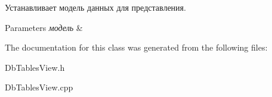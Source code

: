 Устанавливает модель данных для представления. 


\begin{DoxyParams}{Parameters}
{\em модель} & \\
\hline
\end{DoxyParams}


The documentation for this class was generated from the following files\+:\begin{DoxyCompactItemize}
\item 
Db\+Tables\+View.\+h\item 
Db\+Tables\+View.\+cpp\end{DoxyCompactItemize}
